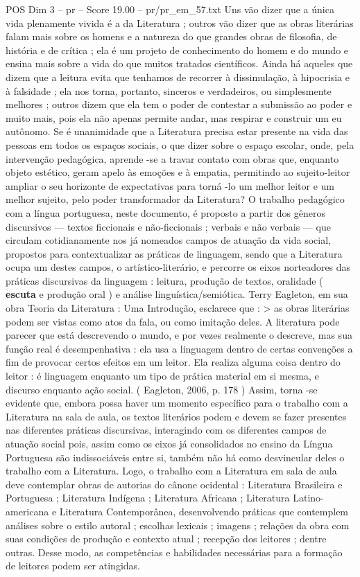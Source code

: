 \begin{textsample}{POS Dim 3 – pr – Score 19.00 – pr/pr\_em\_57.txt}
Uns vão dizer que a única vida plenamente vivida é a da Literatura ; outros vão dizer que as obras literárias falam mais sobre os homens e a natureza do que grandes obras de filosofia, de história e de crítica ; ela é um projeto de conhecimento do homem e do mundo e ensina mais sobre a vida do que muitos tratados científicos.
Ainda há aqueles que dizem que a leitura evita que tenhamos de recorrer à dissimulação, à hipocrisia e à falsidade ; ela nos torna, portanto, sinceros e verdadeiros, ou simplesmente melhores ; outros dizem que ela tem o poder de contestar a submissão ao poder e muito mais, pois ela não apenas permite andar, mas respirar e construir um eu autônomo.
Se é unanimidade que a Literatura precisa estar presente na vida das pessoas em todos os espaços sociais, o que dizer sobre o espaço escolar, onde, pela intervenção pedagógica, aprende -se a travar contato com obras que, enquanto objeto estético, geram apelo às emoções e à empatia, permitindo ao sujeito-leitor ampliar o seu horizonte de expectativas para torná -lo um melhor leitor e um melhor sujeito, pelo poder transformador da Literatura?
O trabalho pedagógico com a língua portuguesa, neste documento, é proposto a partir dos gêneros discursivos — textos ficcionais e não-ficcionais ; verbais e não verbais — que circulam cotidianamente nos já nomeados campos de atuação da vida social, propostos para contextualizar as práticas de linguagem, sendo que a Literatura ocupa um destes campos, o artístico-literário, e percorre os eixos norteadores das práticas discursivas da linguagem : leitura, produção de textos, oralidade ( \textbf{escuta} e produção oral ) e análise linguística/semiótica.
Terry Eagleton, em sua obra Teoria da Literatura : Uma Introdução, esclarece que : > as obras literárias podem ser vistas como atos da fala, ou como imitação deles.
A literatura pode parecer que está descrevendo o mundo, e por vezes realmente o descreve, mas sua função real é desempenhativa : ela usa a linguagem dentro de certas convenções a fim de provocar certos efeitos em um leitor.
Ela realiza alguma coisa dentro do leitor : é linguagem enquanto um tipo de prática material em si mesma, e discurso enquanto ação social. ( Eagleton, 2006, p. 178 ) Assim, torna -se evidente que, embora possa haver um momento específico para o trabalho com a Literatura na sala de aula, os textos literários podem e devem se fazer presentes nas diferentes práticas discursivas, interagindo com os diferentes campos de atuação social pois, assim como os eixos já consolidados no ensino da Língua Portuguesa são indissociáveis entre si, também não há como desvincular deles o trabalho com a Literatura.
Logo, o trabalho com a Literatura em sala de aula deve contemplar obras de autorias do cânone ocidental : Literatura Brasileira e Portuguesa ; Literatura Indígena ; Literatura Africana ; Literatura Latino-americana e Literatura Contemporânea, desenvolvendo práticas que contemplem análises sobre o estilo autoral ; escolhas lexicais ; imagens ; relações da obra com suas condições de produção e contexto atual ; recepção dos leitores ; dentre outras.
Desse modo, as competências e habilidades necessárias para a formação de leitores podem ser atingidas.


\end{textsample}
